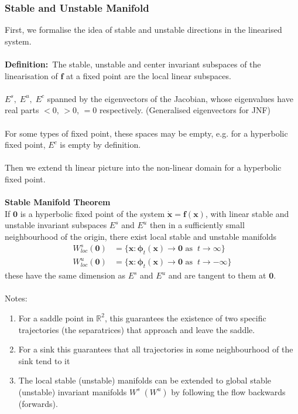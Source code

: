 \documentclass{article}
\newcommand{\definition}{\textbf{Definition:}}              %
\newcommand{\bp}{\bm{\phi}}                                 %
\begin{document}
\subsubsection{Stable and Unstable Manifold}
First, we formalise the idea of stable and unstable directions in the linearised
system.
\\
\\
\definition\ The stable, unstable and center invariant subspaces of the
linearisation of $\bm{f}$ at a fixed point are the local linear subspaces.
\\
\\
$E^s, \; E^u, \; E^c$ spanned by the eigenvectors of the Jacobian, whose 
eigenvalues have real parts $<0$, $ >0$,  $=0$ respectively. (Generalised
eigenvectors for JNF)
\\
\\
For some types of fixed point, these spaces may be empty, e.g. for a hyperbolic
fixed point, $E^c$ is empty by definition.
\\
\\
Then we extend th linear picture into the non-linear domain for a hyperbolic
fixed point.
\\
\\
\textbf{Stable Manifold Theorem}
\\
If $\bm{0}$ is a hyperbolic fixed point of the system $\dot{\bm{x}} = \bm{f}(\bm{x})$,
with linear stable and unstable invariant subspaces $E^s$ and $E^u$ then in a 
sufficiently small neighbourhood of the origin, there exist local stable and
unstable manifolds
\begin{align*}
W^s_{loc}(\bm{0}) &= \{ \bm{x} : \bp_t(\bm{x}) \to \bm{0} \mbox{ as } \
t \to \infty \} \\
W^u_{loc}(\bm{0}) &= \{ \bm{x} : \bp_t(\bm{x}) \to \bm{0} \mbox{ as } \
t \to -\infty \} 
\end{align*}
these have the same dimension as $E^s$ and $E^u$ and are tangent to them
at $\bm{0}$.
\\
\\
Notes:
\begin{enumerate}[(1)]
\item For a saddle point in $\mathbb{R}^2$, this guarantees the existence of
two specific trajectories (the separatrices) that approach and leave the saddle.
\item For a sink this guarantees that all trajectories in some neighbourhood of the
sink tend to it
\item The local stable (unstable) manifolds can be extended to global 
stable (unstable) invariant manifolds $W^s \; (W^u)$ by following the flow 
backwards (forwards).
\end{enumerate}
\end{document}
